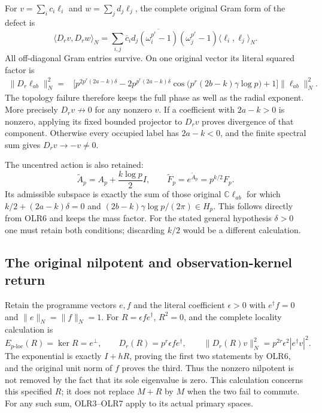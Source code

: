 For $v=\sum_i c_i\ell_i$ and $w=\sum_jd_j\ell_j$, the complete
original Gram form of the defect is
\[
\langle D_rv,D_rw\rangle_N
=\sum_{i,j}\overline c_i d_j
 \overline{(\omega_i^{p^r}-1)}(\omega_j^{p^r}-1)
                   \langle\ell_i,\ell_j\rangle_N.
\tag{OLR10}
\]
All off-diagonal Gram entries survive. On one original vector its
literal squared factor is
\[
\begin{split}
\|D_r\ell_{ab}\|_N^2
={}&\bigl[p^{2p^r(2a-k)\delta}
-2p^{p^r(2a-k)\delta}
 \cos\bigl(p^r(2b-k)\gamma\log p\bigr)+1\bigr]
                          \|\ell_{ab}\|_N^2.
\end{split}
\tag{OLR11}
\]
The topology failure therefore keeps the full phase as well as the
radial exponent. More precisely $D_rv\not\to0$ for any nonzero $v$.
If a coefficient with $2a-k>0$ is nonzero, applying its fixed
bounded projector to $D_rv$ proves divergence of that component.
Otherwise every occupied label has $2a-k<0$, and the finite
spectral sum gives $D_rv\to-v\ne0$.

The uncentred action is also retained:
\[
\widetilde A_p=A_p+\frac{k\log p}{2}I,\qquad
\widetilde F_p=e^{\widetilde A_p}=p^{k/2}F_p.
\tag{OLR12}
\]
Its admissible subspace is exactly the sum of those original
$\mathbb C\ell_{ab}$ for which
$k/2+(2a-k)\delta=0$ and
$(2b-k)\gamma\log p/(2\pi)\in H_p$.
This follows directly from OLR6 and keeps the mass factor.
For the stated general hypothesis $\delta>0$ one must retain both
conditions; discarding $k/2$ would be a different calculation.

\subsection{The original nilpotent and observation-kernel return}

Retain the programme vectors $e,f$ and the literal coefficient
$\epsilon>0$ with $e^\dagger f=0$ and
$\|e\|_N=\|f\|_N=1$. For $R=\epsilon fe^\dagger$, $R^2=0$,
and the complete locality calculation is
\[
E_{p\text{-loc}}(R)=\ker R=e^\perp,\qquad
D_r(R)=p^r\epsilon fe^\dagger,\qquad
\|D_r(R)v\|_N^2=p^{2r}\epsilon^2|e^\dagger v|^2.
\tag{OLR13}
\]
The exponential is exactly $I+hR$, proving the first two statements
by OLR6, and the original unit norm of $f$ proves the third.
Thus the nonzero nilpotent is not removed by the fact that its sole
eigenvalue is zero. This calculation concerns this specified $R$;
it does not replace $M+R$ by $M$ when the two fail to commute.
For any such sum, OLR3--OLR7 apply to its actual primary spaces.

